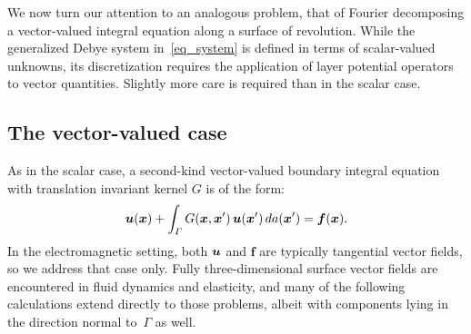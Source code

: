 \documentclass[11pt]{article}
\newcommand{\vct}{\vectorsym}
\newcommand{\bn}{\vct{ n}}
\newcommand{\bx}{\vct{ x}}
\newcommand{\bcH}{\bm{\mathcal H}}
\newcommand{\bcJ}{\bm{\mathcal J}}
\newcommand{\bJ}{\vct{ J}}
\newcommand{\bK}{\vct{ K}}
\newcommand{\cS}{\mathcal S}
\newcommand\bsf{\vct{ f}}
\newcommand\bu{\vct{ u}}
\numberwithin{equation}{section}
\begin{document}
We now turn our attention to an analogous problem, that of Fourier
decomposing a vector-valued integral equation along a surface of
revolution.  While the generalized Debye system in~\eqref{eq_system}
is defined in terms of scalar-valued unknowns, its discretization
requires the application of layer potential operators to vector
quantities. Slightly more care is required than in the
scalar case.


\subsection{The vector-valued case}


As in the scalar case, 
a second-kind vector-valued boundary integral equation with
translation invariant kernel $G$ is of the form:
\begin{equation}\label{eq_vecinteq}
  \bu(\bx) + \int_\Gamma G(\bx,\bx') \, \bu(\bx') \, da(\bx') =
  \bsf(\bx).
\end{equation}
In the electromagnetic setting, both $\bu$ and $\bm f$ are
typically tangential vector fields, so we address that case only.  
Fully three-dimensional surface vector fields are encountered in
fluid dynamics and elasticity, and many of the following
calculations extend directly to those problems, albeit with components lying in the
direction normal to~$\Gamma$ as well.
\end{document}
